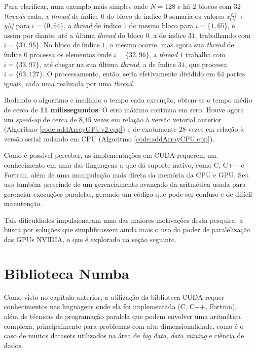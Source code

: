 \documentclass[12pt,
openright, 
oneside, %
a4paper,    %
brazil]{facom-ufu-abntex2}
\begin{document}
Para clarificar, num exemplo mais simples onde $N = 128$ e há $2$ blocos com $32$ \textit{threads} cada, a \textit{thread} de índice $0$ do bloco de índice $0$ somaria os valores \textit{x[i] + y[i]} para $i = \{0, 64\}$, a \textit{thread} de índice $1$ do mesmo bloco para $i = \{1, 65\}$, e assim por diante, até a última \textit{thread} do bloco $0$, a de índice $31$, trabalhando com $i = \{31, 95 \}$. No bloco de índice $1$, o mesmo ocorre, mas agora sua \textit{thread} de índice $0$ processa os elementos onde $i = \{32, 96\}$, a \textit{thread} $1$ trabalha com $i = \{33, 97\}$, até chegar na sua última \textit{thread}, a de índice $31$, que processa $i = \{63, 127\}$. O processamento, então, seria efetivamente dividido em $64$ partes iguais, cada uma realizada por uma \textit{thread}.

Rodando o algoritmo e medindo o tempo cada execução, obtem-se o tempo médio de cerca de \textbf{11 milissegundos}. O erro máximo continua em zero. Houve agora um \textit{speed-up} de cerca de 8,45 vezes em relação à versão vetorial anterior (Algoritmo \ref{code:addArrayGPUv2.cpp}) e de exatamente 28 vezes em relação à versão serial rodando em CPU (Algoritmo \ref{code:addArrayCPU.cpp}).

Como é possível perceber, as implementações em CUDA requerem um conhecimento em uma das linguagens a que dá suporte nativo, como C, C++ e Fortran, além de uma manipulação mais direta da memória da CPU e GPU. Seu uso também prescinde de um gerenciamento avançado da aritmética usada para gerenciar execuções paralelas, gerando um código que pode ser confuso e de difícil manutenção.

Tais dificuldades impulsionaram uma das maiores motivações desta pesquisa: a busca por soluções que simplificassem ainda mais o uso do poder de paralelização das GPUs NVIDIA, o que é explorado na seção seguinte.




\section{Biblioteca Numba}
\label{sec:numba}

Como visto no capítulo anterior, a utilização da biblioteca CUDA requer conhecimentos nas linguagens onde ela foi implementada (C, C++, Fortran), além de técnicas de programação paralela que podem envolver uma aritmética complexa, principalmente para problemas com alta dimensionalidade, como é o caso de muitos datasets utilizados na área de \textit{big data}, \textit{data mining} e ciência de dados.
\end{document}
